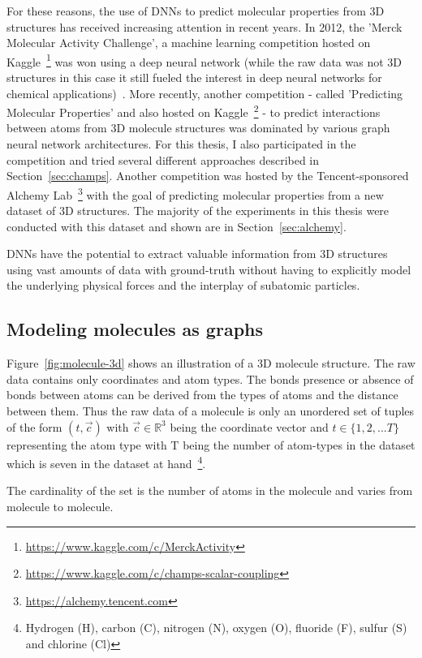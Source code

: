 For these reasons, the use of DNNs to predict molecular properties from 3D structures has received increasing attention in recent years. In 2012, the 'Merck Molecular Activity Challenge', a machine learning competition hosted on Kaggle~\footnote{\url{https://www.kaggle.com/c/MerckActivity}} was won using a deep neural network (while the raw data was not 3D structures in this case it still fueled the interest in deep neural networks for chemical applications)~\cite{Ma2015}. More recently, another competition - called 'Predicting Molecular Properties' and also hosted on Kaggle~\footnote{\url{https://www.kaggle.com/c/champs-scalar-coupling}} - to predict interactions between atoms from 3D molecule structures was dominated by various graph neural network architectures. For this thesis, I also participated in the competition and tried several different approaches described in Section~\ref{sec:champs}. Another competition was hosted by the Tencent-sponsored Alchemy Lab~\footnote{\url{https://alchemy.tencent.com}} with the goal of predicting molecular properties from a new dataset of 3D structures. The majority of the experiments in this thesis were conducted with this dataset and shown are in Section~\ref{sec:alchemy}.

DNNs have the potential to extract valuable information from 3D structures using vast amounts of data with ground-truth without having to explicitly model the underlying physical forces and the interplay of subatomic particles.

\subsection{Modeling molecules as graphs}
\label{sec:molecules-as-graphs}

Figure~\ref{fig:molecule-3d} shows an illustration of a 3D molecule structure. The raw data contains only coordinates and atom types. The bonds presence or absence of bonds between atoms can be derived from the types of atoms and the distance between them. Thus the raw data of a molecule is only an unordered set of tuples of the form $(t, \vec{c})$
with $\vec{c} \in \mathbb{R}^3$ being the coordinate vector
and $t \in \{1, 2, ... T\} $ representing the atom type with T being the number of atom-types in the dataset which is seven in the dataset at hand~\footnote{Hydrogen (H), carbon (C), nitrogen (N), oxygen (O), fluoride (F), sulfur (S) and chlorine (Cl)}.


The cardinality of the set is the number of atoms in the molecule and varies from molecule to molecule.


